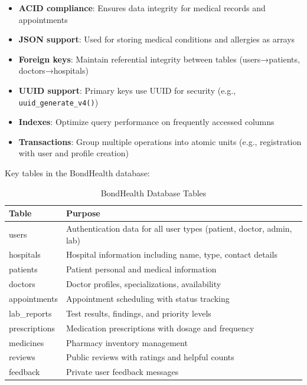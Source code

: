 \begin{itemize}
    \item \textbf{ACID compliance}: Ensures data integrity for medical records and appointments
    \item \textbf{JSON support}: Used for storing medical conditions and allergies as arrays
    \item \textbf{Foreign keys}: Maintain referential integrity between tables (users→patients, doctors→hospitals)
    \item \textbf{UUID support}: Primary keys use UUID for security (e.g., \texttt{uuid\_generate\_v4()})
    \item \textbf{Indexes}: Optimize query performance on frequently accessed columns
    \item \textbf{Transactions}: Group multiple operations into atomic units (e.g., registration with user and profile creation)
\end{itemize}

Key tables in the BondHealth database:

\begin{table}[H]
    \centering
    \begin{tabular}{|l|p{8cm}|}
        \hline
        \textbf{Table} & \textbf{Purpose} \\
        \hline
        users & Authentication data for all user types (patient, doctor, admin, lab) \\
        \hline
        hospitals & Hospital information including name, type, contact details \\
        \hline
        patients & Patient personal and medical information \\
        \hline
        doctors & Doctor profiles, specializations, availability \\
        \hline
        appointments & Appointment scheduling with status tracking \\
        \hline
        lab\_reports & Test results, findings, and priority levels \\
        \hline
        prescriptions & Medication prescriptions with dosage and frequency \\
        \hline
        medicines & Pharmacy inventory management \\
        \hline
        reviews & Public reviews with ratings and helpful counts \\
        \hline
        feedback & Private user feedback messages \\
        \hline
    \end{tabular}
    \caption{BondHealth Database Tables}
    \label{tab:tables}
\end{table}

